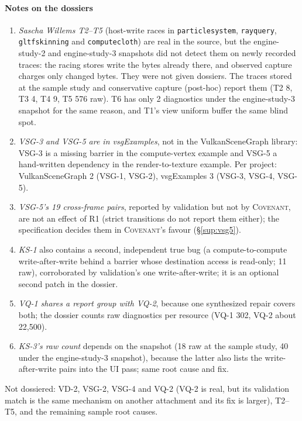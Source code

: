 \documentclass[acmtog,anonymous,review]{acmart}
\newcommand{\sys}{\textsc{Covenant}\xspace}
\newcommand{\code}[1]{\texttt{#1}}
\begin{document}
\paragraph{Notes on the dossiers}
\begin{enumerate}
\item \emph{Sascha Willems T2--T5} (host-write races in \code{particlesystem}, \code{rayquery}, \code{gltfskinning} and
  \code{computecloth}) are real in the source, but the engine-study-2 and engine-study-3 snapshots did not detect them
  on newly recorded traces: the racing stores write the bytes already there, and observed capture charges only changed
  bytes. They were not given dossiers. The traces stored at the sample study and conservative capture (post-hoc) report
  them (T2 8, T3 4, T4 9, T5 576 raw). T6 has only 2 diagnostics under the engine-study-3 snapshot for the same reason,
  and T1's view uniform buffer the same blind spot.
\item \emph{VSG-3 and VSG-5 are in vsgExamples}, not in the VulkanSceneGraph library: VSG-3 is a missing barrier in the
  compute-vertex example and VSG-5 a hand-written dependency in the render-to-texture example. Per project:
  VulkanSceneGraph 2 (VSG-1, VSG-2), vsgExamples 3 (VSG-3, VSG-4, VSG-5).
\item \emph{VSG-5's 19 cross-frame pairs}, reported by validation but not by \sys, are not an effect of R1 (strict
  transitions do not report them either); the specification decides them in \sys's favour (\S\ref{sup:vsg5}).
\item \emph{KS-1} also contains a second, independent true bug (a compute-to-compute write-after-write behind a barrier
  whose destination access is read-only; 11 raw), corroborated by validation's one write-after-write; it is an optional
  second patch in the dossier.
\item \emph{VQ-1 shares a report group with VQ-2}, because one synthesized repair covers both; the dossier counts raw
  diagnostics per resource (VQ-1 302, VQ-2 about 22,500).
\item \emph{KS-3's raw count} depends on the snapshot (18 raw at the sample study, 40 under the engine-study-3
  snapshot), because the latter also lists the write-after-write pairs into the UI pass; same root cause and fix.
\end{enumerate}
Not dossiered: VD-2, VSG-2, VSG-4 and VQ-2 (VQ-2 is real, but its validation match is the same mechanism on another
attachment and its fix is larger), T2--T5, and the remaining sample root causes.
\end{document}
